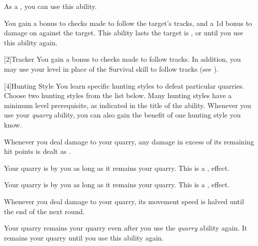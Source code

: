             As a , you can use this ability.
            \begin{ability}
                \begin{spelltargetinginfo}
                \end{spelltargetinginfo}
                \begin{spelleffects}
                    \spelleffect You gain a  bonus to checks made to follow the target's tracks, and a \plus1d bonus to damage on  against the target.
                    This ability lasts the target is , or until you use this ability again.
                \end{spelleffects}
            \end{ability}

            [2]{Tracker}
            You gain a  bonus to checks made to follow tracks.
            In addition, you may use your level in place of the Survival skill to follow tracks (see ).

            [4]{Hunting Style}
            You learn specific hunting styles to defeat particular quarries.
            Choose two hunting styles from the list below.
            Many hunting styles have a minimum level prerequisite, as indicated in the title of the ability.
            Whenever you use your \textit{quarry} ability, you can also gain the benefit of one hunting style you know.

            Whenever you deal damage to your quarry, any damage in excess of its remaining hit points is dealt as .

            Your quarry is \shaken by you as long as it remains your quarry.
            This is a ,  effect.

            Your quarry is \goaded by you as long as it remains your quarry.
            This is a ,  effect.

            Whenever you deal damage to your quarry, its movement speed is halved until the end of the next round.

            Your quarry remains your quarry even after you use the \textit{quarry} ability again.
            It remains your quarry until you use this ability again.

